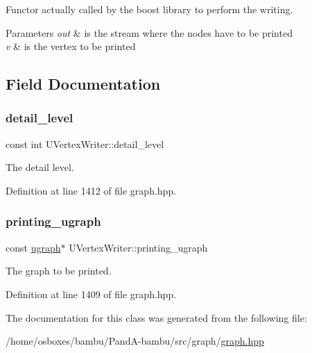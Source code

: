 Functor actually called by the boost library to perform the writing. 


\begin{DoxyParams}{Parameters}
{\em out} & is the stream where the nodes have to be printed \\
\hline
{\em v} & is the vertex to be printed \\
\hline
\end{DoxyParams}


\subsection{Field Documentation}
\mbox{\label{classUVertexWriter_af32b2c1e4d60e66c0ead7fc6582d6291}} 
\subsubsection{\texorpdfstring{detail\+\_\+level}{detail\_level}}
{\footnotesize\ttfamily const int U\+Vertex\+Writer\+::detail\+\_\+level\hspace{0.3cm}{\ttfamily [protected]}}



The detail level. 



Definition at line 1412 of file graph.\+hpp.

\mbox{\label{classUVertexWriter_a3383b5249bed731ea5a4728624fb03bc}} 
\subsubsection{\texorpdfstring{printing\+\_\+ugraph}{printing\_ugraph}}
{\footnotesize\ttfamily const \hyperlink{structugraph}{ugraph}$\ast$ U\+Vertex\+Writer\+::printing\+\_\+ugraph\hspace{0.3cm}{\ttfamily [protected]}}



The graph to be printed. 



Definition at line 1409 of file graph.\+hpp.



The documentation for this class was generated from the following file\+:\begin{DoxyCompactItemize}
\item 
/home/osboxes/bambu/\+Pand\+A-\/bambu/src/graph/\hyperlink{graph_8hpp}{graph.\+hpp}\end{DoxyCompactItemize}
